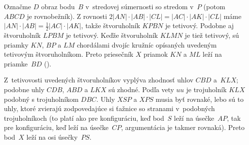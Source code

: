 {%
Označme $D$ obraz bodu~$B$ v~stredovej súmernosti so stredom v~$P$ (potom $ABCD$ je rovnobežník).
Z rovnosti $2|AN|\cdot |AB|\cdot |CL| = |AC|\cdot |AK|\cdot |CL|$ máme ${|AN|\cdot |AB|} = \frac12|AC|\cdot |AK|$, takže štvoruholník $KPBN$ je tetivový. Podobne aj štvoruholník $LPBM$ je tetivový.
Keďže štvoruholník $KLMN$ je tiež tetivový, sú priamky $KN$, $BP$ a $LM$ chordálami dvojíc kružníc opísaných uvedeným tetivovým štvoruholníkom.
Preto priesečník $X$ priamok $KN$ a $ML$ leží na priamke~$BD$ (\obr).
%

Z~tetivovosti uvedených štvoruholníkov vyplýva zhodnosť uhlov $CBD$ a~$KLX$; podobne uhly $CDB$, $ABD$ a $LKX$ sú zhodné.
Podľa vety $uu$ je trojuholník $KLX$ podobný s trojuholníkom $DBC$. Uhly $XSP$ a $XPS$ musia byť rovnaké, lebo sú to uhly, ktoré zvierajú zodpovedajúce si ťažnice so stranami v~podobných trojuholníkoch (to platí ako pre konfiguráciu, keď bod~$S$ leží na úsečke~$AP$, tak pre konfiguráciu, keď leží na úsečke~$CP$, argumentácia je takmer rovnaká). Preto bod~$X$ leží na osi úsečky~$PS$.
}

